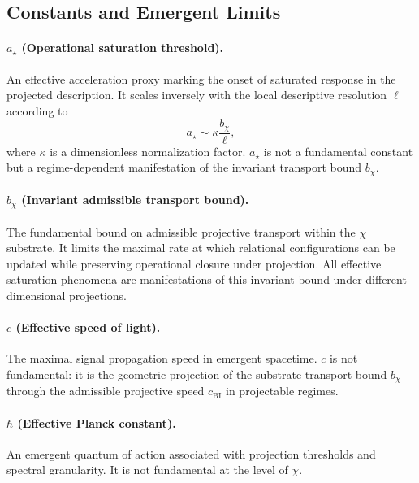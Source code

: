 \subsection{Constants and Emergent Limits}
  \label{subsec:constants-and-emergent-limits}

  \paragraph{\texorpdfstring{$a_{\star}$}{a★} (Operational saturation threshold).}
    An effective acceleration proxy marking the onset of saturated
    response in the projected description.
    It scales inversely with the local descriptive resolution $\ell$
    according to
    \[
      a_{\star} \sim \kappa \frac{b_{\chi}}{\ell},
    \]
    where $\kappa$ is a dimensionless normalization factor.
    $a_{\star}$ is not a fundamental constant but a regime-dependent
    manifestation of the invariant transport bound $b_{\chi}$.

  \paragraph{\texorpdfstring{$b_{\chi}$}{bχ} (Invariant admissible transport bound).}
    The fundamental bound on admissible projective transport within the
    $\chi$ substrate.
    It limits the maximal rate at which relational configurations can be
    updated while preserving operational closure under projection.
    All effective saturation phenomena are manifestations of this invariant
    bound under different dimensional projections.

  \paragraph{\texorpdfstring{$c$}{c} (Effective speed of light).}
    The maximal signal propagation speed in emergent spacetime.
    $c$ is not fundamental: it is the geometric projection of the
    substrate transport bound $b_{\chi}$ through the admissible projective
    speed $c_{\mathrm{BI}}$ in projectable regimes.

  \paragraph{\texorpdfstring{$\hbar$}{ℏ} (Effective Planck constant).}
    An emergent quantum of action associated with projection thresholds and spectral
    granularity.
    It is not fundamental at the level of $\chi$.

